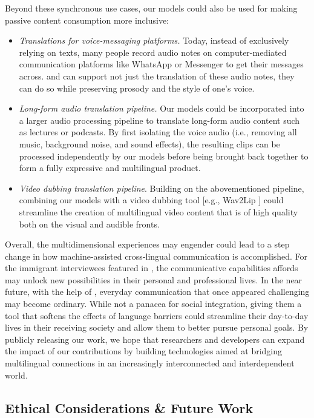 Beyond these synchronous use cases, our models could also be used for making passive content consumption more inclusive:
\begin{itemize}
  \item \textit{Translations for voice-messaging platforms.} Today, instead of exclusively relying on texts, many people record audio notes on computer-mediated communication platforms like WhatsApp or Messenger to get their messages across. \mfourttwo and \expressive can support not just the translation of these audio notes, they can do so while preserving prosody and the style of one's voice.
  \item \textit{Long-form audio translation pipeline.} Our models could be incorporated into a larger audio processing pipeline to translate long-form audio content such as lectures or podcasts. By first isolating the voice audio (i.e., removing all music, background noise, and sound effects), the resulting clips can be processed independently by our models before being brought back together to form a fully expressive and multilingual product.
  \item \textit{Video dubbing translation pipeline}. Building on the abovementioned pipeline, combining our models with a video dubbing tool [e.g., Wav2Lip \citep{prajwal2020lip}] could streamline the creation of multilingual video content that is of high quality both on the visual and audible fronts.
\end{itemize}

Overall, the multidimensional experiences \seamless may engender could lead to a step change in how machine-assisted cross-lingual communication is accomplished. For the immigrant interviewees featured in , the communicative capabilities \seamless affords may unlock new possibilities in their personal and professional lives. In the near future, with the help of \seamless, everyday communication that once appeared challenging may become ordinary. While not a panacea for social integration, giving them a tool that softens the effects of language barriers could streamline their day-to-day lives in their receiving society and allow them to better pursue personal goals. By publicly releasing our work, we hope that researchers and developers can expand the impact of our contributions by building technologies aimed at bridging multilingual connections in an increasingly interconnected and interdependent world.

\subsection{Ethical Considerations \& Future Work}

